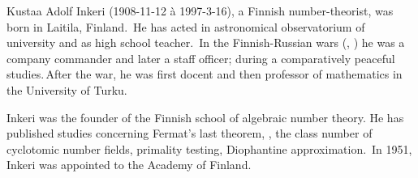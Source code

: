 \documentclass[12pt]{article}
\theoremstyle{definition}
\begin{document}
Kustaa Adolf Inkeri (1908-11-12 \`a 1997-3-16), a Finnish number-theorist, was born in Laitila, Finland.\, He has acted in astronomical observatorium of university and as high school teacher.\,  In the Finnish-Russian wars (, ) he was a company commander and later a staff officer; during a comparatively peaceful  studies.\,After the war, he was first docent and then professor of mathematics in the University of Turku.

Inkeri was the founder of the Finnish school of algebraic number 
theory.  He has published studies concerning Fermat's last theorem, 
, the class number of cyclotomic number fields, 
primality testing, Diophantine approximation.\, In 1951, Inkeri was 
appointed to the Academy of Finland.
\end{document}
